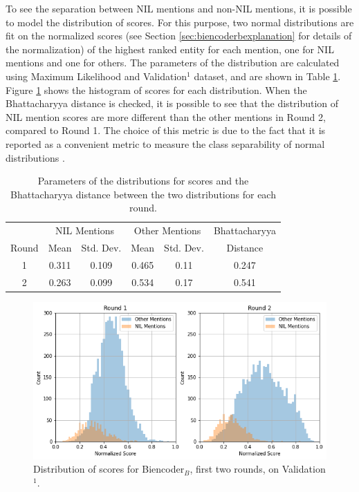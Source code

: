 \documentclass{report}
\theoremstyle{definition}
\theoremstyle{remark}
\begin{document}
To see the separation between NIL mentions and non-NIL mentions, it is possible to model the distribution of scores. For this purpose, two normal distributions are fit on the normalized scores (see Section \ref{sec:biencoderbexplanation} for details of the normalization) of the highest ranked entity for each mention, one for NIL mentions and one for others. The parameters of the distribution are calculated using Maximum Likelihood and Validation$^1$ dataset, and are shown in Table \ref{tab:nilnotnilBparams}. Figure \ref{fig:biencoderbnil} shows the histogram of scores for each distribution. When the Bhattacharyya distance  \cite{bhatt} is checked, it is possible to see that the distribution of NIL mention scores are more different than the other mentions in Round 2, compared to Round 1. The choice of this metric is due to the fact that it is reported as a convenient metric to measure the class separability of normal distributions \cite{bhatt}.

\begin{table}
    \centering
    \begin{tabular}{c|cc|cc|c}
    & \multicolumn{2}{c|}{NIL Mentions} & \multicolumn{2}{c|}{Other Mentions} & Bhattacharyya\\
     Round  &  Mean & Std. Dev. &  Mean &  Std. Dev.& Distance\\
     \hline
    1     &  0.311& 0.109&0.465&0.11&0.247\\ 
    2     & 0.263&0.099 & 0.534 & 0.17&0.541\\
    \end{tabular}
    \caption{Parameters of the distributions for scores and the Bhattacharyya distance between the two distributions for each round.}
    \label{tab:nilnotnilBparams}
\end{table}

\begin{figure}
    \centering
    \includegraphics[scale=0.5]{biencoderbnil.png}
    \caption{Distribution of scores for Biencoder$_B$, first two rounds, on Validation$^1$.}
    \label{fig:biencoderbnil}
\end{figure}
\end{document}

